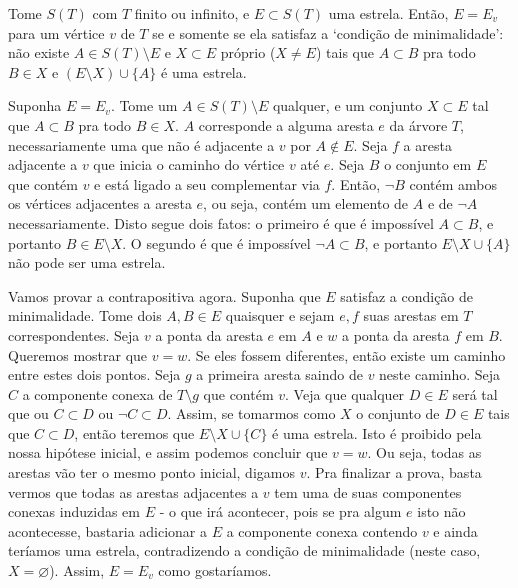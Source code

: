 \begin{proposicao*}
  Tome $S(T)$ com $T$ finito ou infinito, e $E \subset S(T)$ uma estrela. Então, $E = E_v$ para um vértice $v$ de $T$ se e somente se ela satisfaz a `condição de minimalidade': não existe $A \in S(T) \setminus E$ e $X \subset E$ próprio ($X \neq E$) tais que $A \subset B$ pra todo $B \in X$ e $(E \setminus X) \cup \{A\}$ é uma estrela.
\end{proposicao*}
\begin{prova}
Suponha $E = E_v$. Tome um $A \in S(T) \setminus E$ qualquer, e um conjunto $X \subset E$ tal que $A \subset B$ pra todo $B \in X$. $A$ corresponde a alguma aresta $e$ da árvore $T$, necessariamente uma que não é adjacente a $v$ por $A \notin E$. Seja $f$ a aresta adjacente a $v$ que inicia o caminho do vértice $v$ até $e$. Seja $B$ o conjunto em $E$ que contém $v$ e está ligado a seu complementar via $f$. Então, $\lnot B$ contém ambos os vértices adjacentes a aresta $e$, ou seja, contém um elemento de $A$ e de $\lnot A$ necessariamente. Disto segue dois fatos: o primeiro é que é impossível $A \subset B$, e portanto $B \in E \setminus X$. O segundo é que é impossível $\lnot A \subset B$, e portanto $E \setminus X \cup \{A\}$ não pode ser uma estrela. 

Vamos provar a contrapositiva agora. Suponha que $E$ satisfaz a condição de minimalidade. Tome dois $A,B \in E$ quaisquer e sejam $e,f$ suas arestas em $T$ correspondentes. Seja $v$ a ponta da aresta $e$ em $A$ e $w$ a ponta da aresta $f$ em $B$. Queremos mostrar que $v = w$. Se eles fossem diferentes, então existe um caminho entre estes dois pontos. Seja $g$ a primeira aresta saindo de $v$ neste caminho. Seja $C$ a componente conexa de $T \setminus g$ que contém $v$. Veja que qualquer $D \in E$ será tal que ou $C \subset D$ ou $\lnot C \subset D$. Assim, se tomarmos como $X$ o conjunto de $D \in E$ tais que $C \subset D$, então teremos que $E \setminus X \cup \{C\}$ é uma estrela. Isto é proibido pela nossa hipótese inicial, e assim podemos concluir que $v = w$. Ou seja, todas as arestas vão ter o mesmo ponto inicial, digamos $v$. Pra finalizar a prova, basta vermos que todas as arestas adjacentes a $v$ tem uma de suas componentes conexas induzidas em $E$ - o que irá acontecer, pois se pra algum $e$ isto não acontecesse, bastaria adicionar a $E$ a componente conexa contendo $v$ e ainda teríamos uma estrela, contradizendo a condição de minimalidade (neste caso, $X = \varnothing$). Assim, $E = E_v$ como gostaríamos.

\end{prova}


